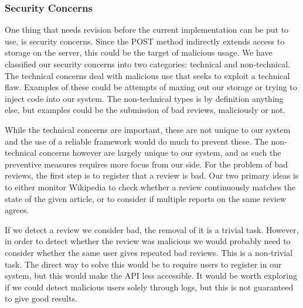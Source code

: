 \subsubsection{Security Concerns}

One thing that needs revision before the current implementation can be put to use, is security concerns. Since the POST method indirectly extends access to storage on the server, this could be the target of malicious usage. We have classified our security concerns into two categories: technical and non-technical. The technical concerns deal with malicious use that seeks to exploit a technical flaw. Examples of these could be attempts of maxing out our storage or trying to inject code into our system. The non-technical types is by definition anything else, but examples could be the submission of bad reviews, maliciously or not.

While the technical concerns are important, these are not unique to our system and the use of a reliable framework would do much to prevent these. The non-technical concerns however are largely unique to our system, and as such the preventive measures requires more focus from our side. For the problem of bad reviews, the first step is to register that a review is bad. Our two primary ideas is to either monitor Wikipedia to check whether a review continuously matches the state of the given article, or to consider if multiple reports on the same review agrees.

If we detect a review we consider bad, the removal of it is a trivial task. However, in order to detect whether the review was malicious we would probably need to consider whether the same user gives repeated bad reviews. This is a non-trivial task. The direct way to solve this would be to require users to register in our system, but this would make the API less accessible. It would be worth exploring if we could detect malicious users solely through logs, but this is not guaranteed to give good results.

